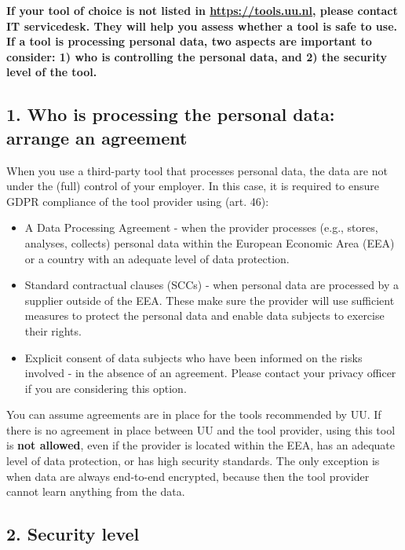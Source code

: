 \documentclass[
]{book}
\providecommand{\tightlist}{%
  \setlength{\itemsep}{0pt}\setlength{\parskip}{0pt}}
\begin{document}
\textbf{If your tool of choice is not listed in \url{https://tools.uu.nl}, please contact
IT servicedesk. They will help you assess
whether a tool is safe to use. If a tool is processing personal data, two aspects
are important to consider: 1) who is controlling the personal data, and 2) the
security level of the tool.}

\hypertarget{who-is-processing-the-personal-data-arrange-an-agreement}{%
\subsection{1. Who is processing the personal data: arrange an agreement}\label{who-is-processing-the-personal-data-arrange-an-agreement}}

When you use a third-party tool that processes personal data, the data are not
under the (full) control of your employer. In this case, it is required to
ensure GDPR compliance of the tool provider using
(art. 46):

\begin{itemize}
\tightlist
\item
  A Data Processing Agreement -
  when the provider processes (e.g., stores, analyses, collects) personal data
  within the European Economic Area (EEA) or a country with an
  adequate level of data protection.
\item
  Standard
  contractual clauses (SCCs) - when personal data are processed by a
  supplier outside of the EEA. These make sure the provider will use
  sufficient measures to protect the personal data and enable data subjects to
  exercise their rights.
\item
  Explicit consent of data subjects who have been informed on the risks
  involved - in the absence of an agreement. Please contact your
  privacy officer
  if you are considering this option.
\end{itemize}

You can assume agreements are in place for the tools recommended by UU.
If there is no agreement in place between UU and the tool provider, using
this tool is \textbf{not allowed}, even if the provider is located within the EEA,
has an adequate level of data protection, or has high security standards. The
only exception is when data are always end-to-end encrypted, because then the
tool provider cannot learn anything from the data.

\hypertarget{security-level}{%
\subsection{2. Security level}\label{security-level}}
\end{document}
